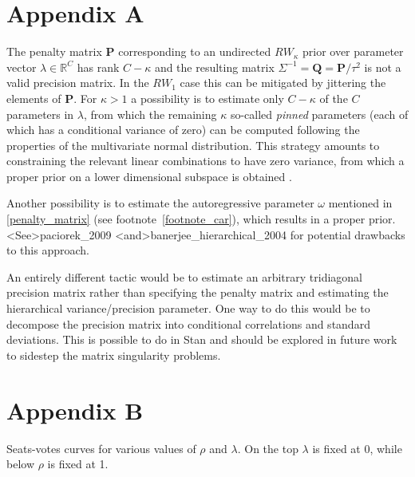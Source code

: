 

\chapter[Prior impropriety]{Appendix A} \label{AppendixA}

The penalty matrix $\mathbf{P}$ corresponding to an undirected $RW_\kappa$ prior over parameter vector $\lambda \in \mathbb{R}^C$ has rank $C - \kappa$ and the resulting matrix $\Sigma^{-1} = \mathbf{Q} = \mathbf{P}/\tau^2$ is not a valid precision matrix. In the $RW_1$ case this can be mitigated by jittering the elements of $\mathbf{P}$. For $\kappa > 1$ a possibility is to estimate only $C - \kappa$ of the $C$ parameters in $\lambda$,  from which the remaining $\kappa$ so-called {\it pinned} parameters (each of which has a conditional variance of zero) can be computed following the properties of the multivariate normal distribution. This strategy amounts to  constraining the relevant linear combinations to have zero variance, from which a proper prior on a lower dimensional subspace is obtained . 

Another possibility is to estimate the autoregressive parameter $\omega$ mentioned in \ref{penalty_matrix} (see footnote~\ref{footnote_car}), which results in a proper prior. \citeA<See>{paciorek_2009} \citeA<and>{banerjee_hierarchical_2004} for potential drawbacks to this approach.

An entirely different tactic would be to estimate an arbitrary tridiagonal precision matrix rather than specifying the penalty matrix and estimating the hierarchical variance/precision parameter. One way to do this would be to decompose the precision matrix into conditional correlations and standard deviations. This is possible to do in Stan and should be explored in future work to sidestep the matrix singularity problems. 


\clearpage
\chapter[Seats-votes curves]{Appendix B}\label{AppendixB}

Seats-votes curves for various values of $\rho$ and $\lambda$. On the top $\lambda$ is fixed at 0, while below $\rho$ is fixed at 1.


